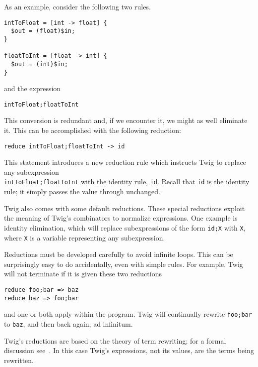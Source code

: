 As an example, consider the following two rules.

\begin{verbatim}
intToFloat = [int -> float] {
  $out = (float)$in;
}

floatToInt = [float -> int] {
  $out = (int)$in;
}
\end{verbatim}

and the expression

\begin{verbatim}
intToFloat;floatToInt
\end{verbatim}

This conversion is redundant and, if we encounter it, we might as well eliminate
it. This can be accomplished with the following reduction:

\begin{verbatim}
reduce intToFloat;floatToInt -> id
\end{verbatim}

This statement introduces a new reduction rule which instructs Twig to replace
any subexpression\\\texttt{intToFloat;floatToInt} with the identity rule,
\texttt{id}. Recall that \texttt{id} is the identity rule; it simply passes the
value through unchanged.

Twig also comes with some default reductions. These special reductions exploit
the meaning of Twig's combinators to normalize expressions. One example is
identity elimination, which will replace subexpressions of the form
\texttt{id;X} with \texttt{X}, where \texttt{X} is a variable representing any
subexpression.

Reductions must be developed carefully to avoid infinite loops. This can be
surprisingly easy to do accidentally, even with simple rules. For example, Twig
will not terminate if it is given these two reductions

\begin{verbatim}
reduce foo;bar => baz
reduce baz => foo;bar
\end{verbatim}

and one or both apply within the program. Twig will continually rewrite
\texttt{foo;bar} to \texttt{baz}, and then back again, ad infinitum.

Twig's reductions are based on the theory of term rewriting; for a formal
discussion see~\cite{baader98rewriting}. In this case Twig's expressions, not
its values, are the terms being rewritten.
